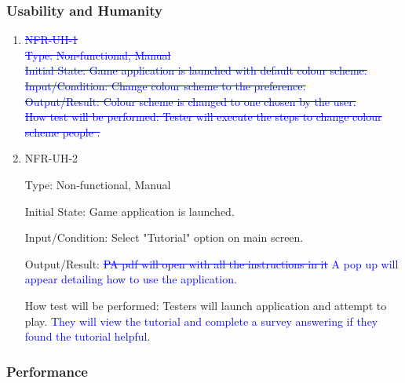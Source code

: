 \documentclass[12pt, titlepage]{article}
\begin{document}
\subsubsection{Usability and Humanity}

\begin{enumerate}

\item{}
\textcolor{blue}{\sout{NFR-UH-1\\
Type: Non-functional, Manual\\
Initial State: Game application is launched with default colour scheme.\\
Input/Condition: Change colour scheme to the preference.\\
Output/Result: Colour scheme is changed to one chosen by the user.\\
How test will be performed: Tester will execute the steps to change colour scheme people .}}


\item{NFR-UH-2\\}

Type: Non-functional, Manual
					
Initial State: Game application is launched.
					
Input/Condition: Select "Tutorial" option on main screen.
					
Output/Result: \textcolor{blue}{\sout{PA pdf will open with all the instructions in it} A pop up will appear detailing how to use the application}.
					
How test will be performed: Testers will launch application and attempt to play. \textcolor{blue}{They will view the tutorial and complete a survey answering if they found the tutorial helpful.}

\end{enumerate}

\subsubsection{Performance}
\end{document}
